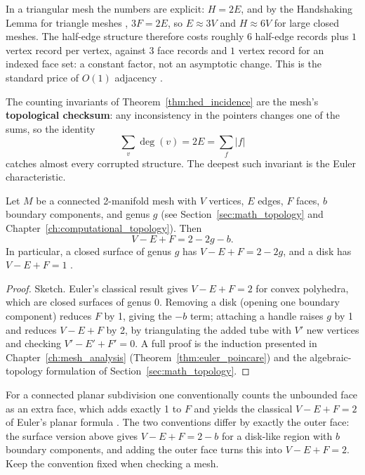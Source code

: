 In a triangular mesh the numbers are explicit: $H = 2E$, and by the
Handshaking Lemma for triangle meshes \cite{diestel2017},
$3F = 2E$, so $E \approx 3V$ and $H \approx 6V$ for large closed meshes. The
half-edge structure therefore costs roughly $6$ half-edge records plus $1$
vertex record per vertex, against $3$ face records and $1$ vertex record
for an indexed face set: a constant factor, not an asymptotic change. This
is the standard price of $O(1)$ adjacency
\cite{botsch2010,ericson2004}.

The counting invariants of Theorem~\ref{thm:hed_incidence} are the mesh's
\textbf{topological checksum}: any inconsistency in the pointers changes
one of the sums, so the identity
\[
\sum_{v} \deg(v) = 2E = \sum_{f} |f|
\]
catches almost every corrupted structure. The deepest such invariant is
the Euler characteristic.

\begin{theorem}\label{thm:hed_euler}
Let $M$ be a connected 2-manifold mesh with $V$ vertices, $E$ edges,
$F$ faces, $b$ boundary components, and genus $g$ (see
Section~\ref{sec:math_topology} and Chapter~\ref{ch:computational_topology}).
Then
\[
V - E + F = 2 - 2g - b .
\]
In particular, a closed surface of genus $g$ has $V - E + F = 2 - 2g$, and
a disk has $V - E + F = 1$ \cite{euler1758,poincare1895}.
\end{theorem}

\begin{proof}
Sketch. Euler's classical result \cite{euler1758} gives $V - E + F = 2$
for convex polyhedra, which are closed surfaces of genus $0$. Removing a
disk (opening one boundary component) reduces $F$ by 1, giving the $-b$
term; attaching a handle raises $g$ by 1 and reduces $V - E + F$ by 2, by
triangulating the added tube with $V'$ new vertices and checking
$V' - E' + F' = 0$. A full proof is the induction presented in
Chapter~\ref{ch:mesh_analysis} (Theorem~\ref{thm:euler_poincare}) and the
algebraic-topology formulation of Section~\ref{sec:math_topology}.
\end{proof}

\begin{remark}
For a connected planar subdivision one conventionally counts the unbounded
face as an extra face, which adds exactly 1 to $F$ and yields the classical
$V - E + F = 2$ of Euler's planar formula \cite{deberg2008}. The two
conventions differ by exactly the outer face: the surface version above
gives $V - E + F = 2 - b$ for a disk-like region with $b$ boundary
components, and adding the outer face turns this into
$V - E + F = 2$. Keep the convention fixed when checking a mesh.
\end{remark}

